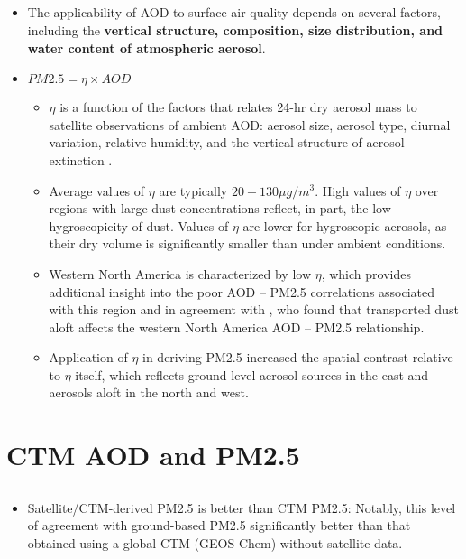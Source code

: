 \documentclass[11pt]{article}
\begin{document}
\subsection{\citet{van2010global}}
\begin{itemize}
    \item The applicability of AOD to surface air quality depends on several factors, including the \textbf{vertical structure, composition, size distribution, and water content of atmospheric aerosol}.
    \item $PM2.5=\eta\times AOD$
    \begin{itemize}
        \item $\eta$ is a function of the factors that relates 24-hr dry aerosol mass to satellite observations of ambient AOD: aerosol size, aerosol type, diurnal variation, relative humidity, and the vertical structure of aerosol extinction \citep{van2006estimating}.
        \item Average values of $\eta$ are typically $20 - 130 \mu g/m^3$. High values of $\eta$ over regions with large dust concentrations \citep{prospero2002environmental} reflect, in part, the low hygroscopicity of dust. Values of $\eta$ are lower for hygroscopic aerosols, as their dry volume is significantly smaller than under ambient conditions.
        \item Western North America is characterized by low $\eta$, which provides additional insight into the poor AOD -- PM2.5 correlations associated with this region and in agreement with \citet{liu2007estimating}, who found that transported dust aloft affects the western North America AOD -- PM2.5 relationship. 
        \item Application of $\eta$ in deriving PM2.5 increased the spatial contrast relative to $\eta$ itself, which reflects ground-level aerosol sources in the east and aerosols aloft in the north and west.
    \end{itemize}
\end{itemize}


\section{CTM AOD and PM2.5}

\subsection{\citet{van2010global}}
\begin{itemize}
    \item Satellite/CTM-derived PM2.5 is better than CTM PM2.5:  Notably, this level of agreement with ground-based PM2.5 significantly better than that obtained using a global CTM (GEOS-Chem) without satellite data. 
\end{itemize}
\end{document}
